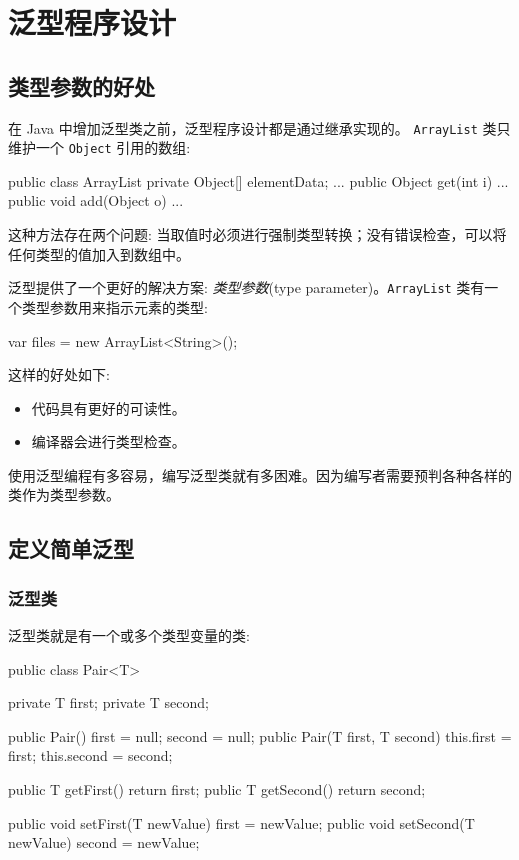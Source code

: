 \section{泛型程序设计}

\subsection{类型参数的好处}

在 Java 中增加泛型类之前，泛型程序设计都是通过继承实现的。 \texttt{ArrayList} 类只维护一个 \texttt{Object} 引用的数组:

\begin{Java}
public class ArrayList {
    private Object[] elementData;
    ...
    public Object get(int i) {...}
    public void add(Object o) {...}
}
\end{Java}

这种方法存在两个问题: 当取值时必须进行强制类型转换；没有错误检查，可以将任何类型的值加入到数组中。

泛型提供了一个更好的解决方案: \textit{类型参数}(type parameter)。\texttt{ArrayList} 类有一个类型参数用来指示元素的类型:

\begin{Java}
var files = new ArrayList<String>();
\end{Java}

这样的好处如下:
\begin{itemize}
    \item 代码具有更好的可读性。
    \item 编译器会进行类型检查。
\end{itemize}

使用泛型编程有多容易，编写泛型类就有多困难。因为编写者需要预判各种各样的类作为类型参数。

\subsection{定义简单泛型}

\subsubsection{泛型类}

泛型类就是有一个或多个类型变量的类:
\begin{Java}
public class Pair<T> {
    private T first;
    private T second;

    public Pair() {first = null; second = null;}
    public Pair(T first, T second) {this.first = first; this.second = second;}

    public T getFirst() {return first;}
    public T getSecond() {return second;}

    public void setFirst(T newValue) {first = newValue;}
    public void setSecond(T newValue) {second = newValue;}
}
\end{Java}

